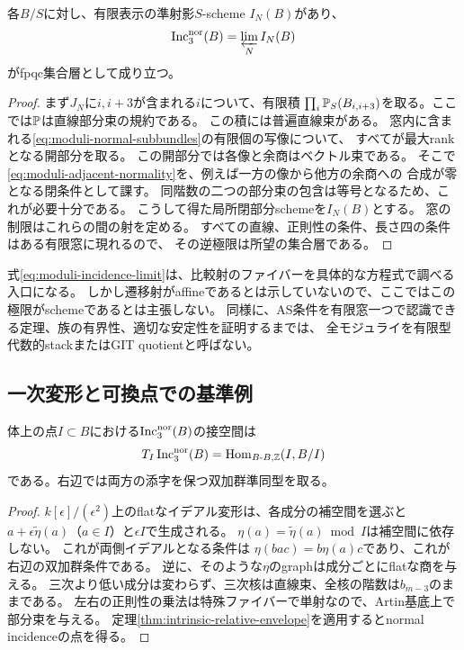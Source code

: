 \begin{proposition}[ファイバーの有限窓での方程式]
\label{prop:moduli-incidence-windows}
各$B/S$に対し、有限表示の準射影$S$-scheme $I_N(B)$があり、
\begin{equation}\label{eq:moduli-incidence-limit}
 \operatorname{Inc}^{\rm nor}_3(B)=\varprojlim_N I_N(B)
\end{equation}
がfpqc集合層として成り立つ。
\end{proposition}
\begin{proof}
まず$J_N$に$i,i+3$が含まれる$i$について、有限積
$\prod_i\mathbb P_S(B_{i,i+3})$を取る。ここでは$\mathbb P$は直線部分束の規約である。
この積には普遍直線束がある。
窓内に含まれる\eqref{eq:moduli-normal-subbundles}の有限個の写像について、
すべてが最大rankとなる開部分を取る。
この開部分では各像と余商はベクトル束である。
そこで\eqref{eq:moduli-adjacent-normality}を、例えば一方の像から他方の余商への
合成が零となる閉条件として課す。
同階数の二つの部分束の包含は等号となるため、これが必要十分である。
こうして得た局所閉部分schemeを$I_N(B)$とする。
窓の制限はこれらの間の射を定める。
すべての直線、正則性の条件、長さ四の条件はある有限窓に現れるので、
その逆極限は所望の集合層である。
\end{proof}

式\eqref{eq:moduli-incidence-limit}は、比較射のファイバーを具体的な方程式で調べる入口になる。
しかし遷移射がaffineであるとは示していないので、ここではこの極限がschemeであるとは主張しない。
同様に、AS条件を有限窓一つで認識できる定理、族の有界性、適切な安定性を証明するまでは、
全モジュライを有限型代数的stackまたはGIT quotientと呼ばない。

\subsection{一次変形と可換点での基準例}

\begin{proposition}[固定ambient上の接空間]
\label{prop:moduli-normal-tangent}
体上の点$I\subset B$における$\operatorname{Inc}^{\rm nor}_3(B)$の接空間は
\begin{equation}\label{eq:moduli-normal-tangent}
 T_I\operatorname{Inc}^{\rm nor}_3(B)
   =\operatorname{Hom}_{B\text{-}B,\mathbb Z}(I,B/I)
\end{equation}
である。右辺では両方の添字を保つ双加群準同型を取る。
\end{proposition}
\begin{proof}
$k[\epsilon]/(\epsilon^2)$上のflatなイデアル変形は、各成分の補空間を選ぶと
$a+\epsilon\widetilde\eta(a)$（$a\in I$）と$\epsilon I$で生成される。
$\eta(a)=\widetilde\eta(a)\bmod I$は補空間に依存しない。
これが両側イデアルとなる条件は
$\eta(bac)=b\eta(a)c$であり、これが右辺の双加群条件である。
逆に、そのような$\eta$のgraphは成分ごとにflatな商を与える。
三次より低い成分は変わらず、三次核は直線束、全核の階数は$b_{m-3}$のままである。
左右の正則性の乗法は特殊ファイバーで単射なので、Artin基底上で部分束を与える。
定理\ref{thm:intrinsic-relative-envelope}を適用するとnormal incidenceの点を得る。
\end{proof}

